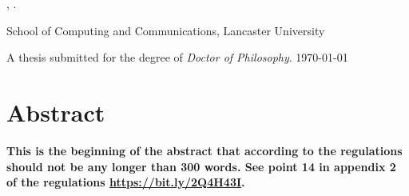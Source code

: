 \begin{center}
\textbf{\thesistitle}

\authorname, \authordegrees.

School of Computing and Communications, Lancaster University

A thesis submitted for the degree of \textit{Doctor of Philosophy}. \monthyeardate\today
\end{center}

\section*{\centering Abstract}

\textbf{This is the beginning of the abstract that according to the regulations should not be any longer than 300 words. See point 14 in appendix 2 of the regulations \url{https://bit.ly/2Q4H43I}.}